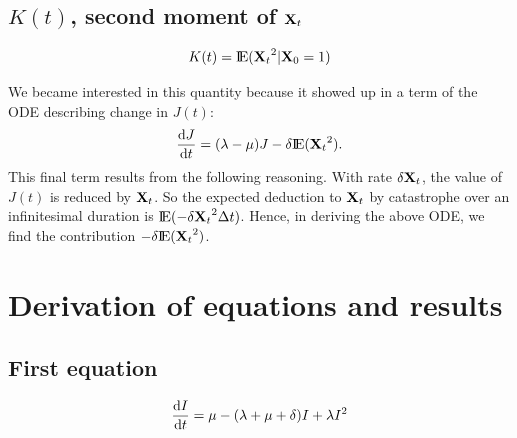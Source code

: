 \subsection*{$K(t)$, second moment of ${{\bf X}_t}$}

\vspace{3pt}
{\Large$$K(t) = {\rm I}\!{\rm E}({{\bf X}_t}^2| {\bf X}_0 = 1)$$}

\noindent
We became interested in this quantity because it showed up in a term of the ODE describing change in $J(t)$:
$$\displaystyle\frac{{\rm d} J}{{\rm d} t} = (\lambda - \mu) J - \delta {\rm I}\!{\rm E}({{\bf X}_t}^2).$$
This final term results from the following reasoning. With rate $\delta {{\bf X}_t}$, the value of $J(t)$ is reduced by ${{\bf X}_t}$. So the expected deduction to ${{\bf X}_t}$ by catastrophe over an infinitesimal duration is ${\rm I}\!{\rm E}( -\delta {{\bf X}_t}^2 \Delta t)$. Hence, in deriving the above ODE, we find the contribution $-\delta {\rm I}\!{\rm E}({{\bf X}_t}^2)$.






























\section{Derivation of equations and results}


\subsection{First equation}


{\large$$\displaystyle\frac{{\rm d} I}{{\rm d} t} = \mu - (\lambda + \mu + \delta) I + \lambda I^2$$}




